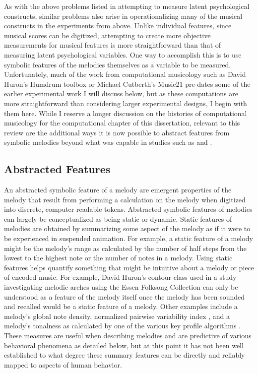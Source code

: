 \documentclass[12pt,]{book}
\begin{document}
As with the above problems listed in attempting to measure latent psychological constructs, similar problems also arise in operationalizing many of the musical constructs in the experiments from above.
Unlike individual features, since musical scores can be digitized, attempting to create more objective measurements for musical features is more straightforward than that of measuring latent psychological variables.
One way to accomplish this is to use symbolic features of the melodies themselves as a variable to be measured.
Unfortunately, much of the work from computational musicology such as David Huron's Humdrum toolbox \citep{huronHumdrumToolkitReference1994} or Michael Cutberth's Music21 \citep{cuthbertMusic21ToolkitComputerAided2010} pre-dates some of the earlier experimental work I will discuss below, but as these computations are more straightforward than considering larger experimental designs, I begin with them here.
While I reserve a longer discussion on the histories of computational musicology for the computational chapter of this dissertation, relevant to this review are the additional ways it is now possible to abstract features from symbolic melodies beyond what was capable in studies such as \citet{ortmannTonalDeterminantsMelodic1933} and \citet{taylorStrategiesMemoryShort1983}.

\hypertarget{abstracted-features}{%
\subsection{Abstracted Features}\label{abstracted-features}}

An abstracted symbolic feature of a melody are emergent properties of the melody that result from performing a calculation on the melody when digitized into discrete, computer readable tokens.
Abstracted symbolic features of melodies can largely be conceptualized as being static or dynamic.
Static features of melodies are obtained by summarizing some aspect of the melody as if it were to be experienced in suspended animation.
For example, a static feature of a melody might be the melody's range as calculated by the number of half steps from the lowest to the highest note or the number of notes in a melody.
Using static features helps quantify something that might be intuitive about a melody or piece of encoded music.
For example, David Huron's contour class used in a study investigating melodic arches \citep{huronMelodicArchWestern1996} using the Essen Folksong Collection \citep{schaffrathEssenFolkSong1995} can only be understood as a feature of the melody itself once the melody has been sounded and recalled would be a static feature of a melody.
Other examples include a melody's global note density, normalized pairwise variability index \citep{grabeDurationalVariabilitySpeech2002}, and a melody's tonalness as calculated by one of the various key profile algorithms \citep{krumhanslCognitiveFoundationsMusical2001, albrechtUseLargeCorpora2013}.
These measures are useful when describing melodies and are predictive of various behavioral phenomena as detailed below, but at this point it has not been well established to what degree these summary features can be directly and reliably mapped to aspects of human behavior.
\end{document}

